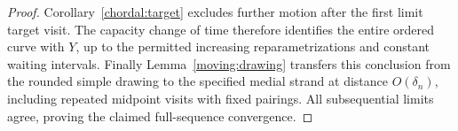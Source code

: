 \begin{proof}
Corollary~\ref{chordal:target} excludes further motion after the first
limit target visit.  The capacity change of time therefore identifies
the entire ordered curve with $Y$, up to the permitted increasing
reparametrizations and constant waiting intervals.  Finally
Lemma~\ref{moving:drawing} transfers this conclusion from the rounded
simple drawing to the specified medial strand at distance
$O(\delta_n)$, including repeated midpoint visits with fixed pairings.
All subsequential limits agree, proving the claimed full-sequence
convergence.
\end{proof}
